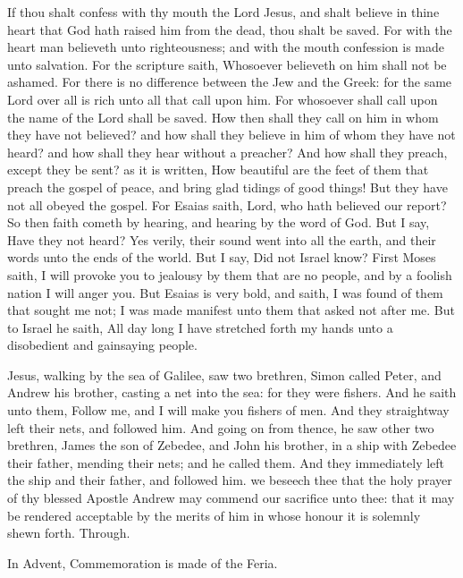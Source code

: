  If thou shalt confess with thy mouth the Lord Jesus, and shalt believe in thine heart that God hath raised him from the dead, thou shalt be saved. For with the heart man believeth unto righteousness; and with the mouth confession is made unto salvation. For the scripture saith, Whosoever believeth on him shall not be ashamed. For there is no difference between the Jew and the Greek: for the same Lord over all is rich unto all that call upon him. For whosoever shall call upon the name of the Lord shall be saved. How then shall they call on him in whom they have not believed? and how shall they believe in him of whom they have not heard? and how shall they hear without a preacher? And how shall they preach, except they be sent? as it is written, How beautiful are the feet of them that preach the gospel of peace, and bring glad tidings of good things! But they have not all obeyed the gospel. For Esaias saith, Lord, who hath believed our report? So then faith cometh by hearing, and hearing by the word of God. But I say, Have they not heard? Yes verily, their sound went into all the earth, and their words unto the ends of the world. But I say, Did not Israel know? First Moses saith, I will provoke you to jealousy by them that are no people, and by a foolish nation I will anger you. But Esaias is very bold, and saith, I was found of them that sought me not; I was made manifest unto them that asked not after me. But to Israel he saith, All day long I have stretched forth my hands unto a disobedient and gainsaying people.



 Jesus, walking by the sea of Galilee, saw two brethren, Simon called Peter, and Andrew his brother, casting a net into the sea: for they were fishers. And he saith unto them, Follow me, and I will make you fishers of men. And they straightway left their nets, and followed him. And going on from thence, he saw other two brethren, James the son of Zebedee, and John his brother, in a ship with Zebedee their father, mending their nets; and he called them. And they immediately left the ship and their father, and followed him.
\secret
{} we beseech thee that the holy prayer of thy blessed Apostle Andrew may commend our sacrifice unto thee: that it may be rendered acceptable by the merits of him in whose honour it is solemnly shewn forth. Through.
\begin{rubric}
    In Advent, Commemoration is made of the Feria.
\end{rubric}

